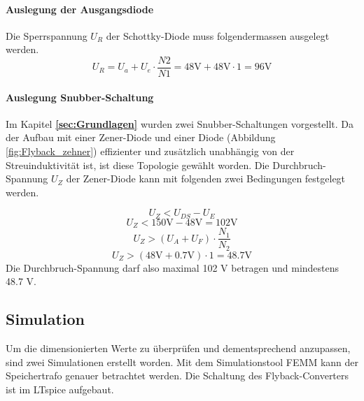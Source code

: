 \paragraph{Auslegung der Ausgangsdiode}
Die Sperrspannung $ U_{R} $ der Schottky-Diode muss folgendermassen ausgelegt werden. \cite{sperrwandler}
\begin{equation}\label{eq:sperrspannung_diode}
U_{R} = U_{a} + U_{e} \cdot \frac{N2}{N1} = 48\mathrm{V} + 48\mathrm{V} \cdot 1 = 96\mathrm{V}
\end{equation}

\paragraph{Auslegung  Snubber-Schaltung}
Im Kapitel \textbf{\ref{sec:Grundlagen} } wurden zwei Snubber-Schaltungen vorgestellt. Da der Aufbau mit einer Zener-Diode und einer Diode (Abbildung \ref{fig:Flyback_zehner}) effizienter und zusätzlich unabhängig von der Streuinduktivität ist, ist diese Topologie gewählt worden. Die Durchbruch-Spannung $ U_{Z} $ der Zener-Diode kann mit folgenden zwei Bedingungen festgelegt werden. \cite{bachelor}  

\begin{equation}\label{eq:sperrspannung_zener1}
U_{Z} < U_{DS} - U_{E}
\end{equation}
\begin{equation}\label{eq:sperrspannung_zener1_berechnet}
U_{Z} <  150\mathrm{V} - 48\mathrm{V}  = 102\mathrm{V}
\end{equation}
\begin{equation}\label{eq:sperrspannung_zehner2}
U_{Z} > (U_{A} + U_{F}) \cdot \frac{N_{1}}{N_{2}}
\end{equation}
\begin{equation}\label{eq:sperrspannung_zehner2_berechnet}
U_{Z} >(48\mathrm{V} + 0.7\mathrm{V}) \cdot 1 = 48.7\mathrm{V}
\end{equation}
Die Durchbruch-Spannung darf also maximal 102 V betragen und mindestens 48.7 V.
\newpage
\subsection{Simulation}\label{sec:simulation}
Um die dimensionierten Werte zu überprüfen und dementsprechend anzupassen, sind zwei Simulationen erstellt worden. Mit dem Simulationstool FEMM kann der Speichertrafo genauer betrachtet werden. Die Schaltung des Flyback-Converters ist im LTspice aufgebaut.

